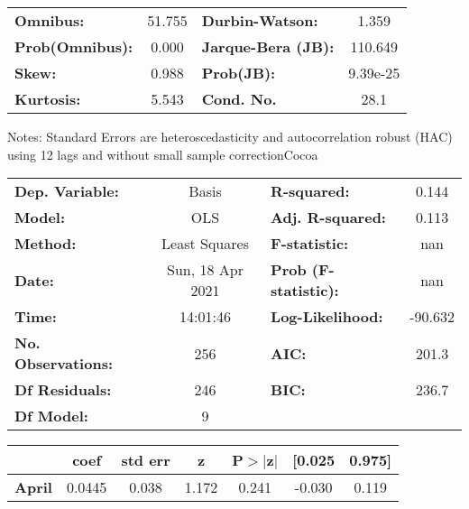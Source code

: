 \begin{center}
\begin{tabular}{lcccccc}
\bottomrule
\end{tabular}
\begin{tabular}{lclc}
\textbf{Omnibus:}       & 51.755 & \textbf{  Durbin-Watson:     } &    1.359  \\
\textbf{Prob(Omnibus):} &  0.000 & \textbf{  Jarque-Bera (JB):  } &  110.649  \\
\textbf{Skew:}          &  0.988 & \textbf{  Prob(JB):          } & 9.39e-25  \\
\textbf{Kurtosis:}      &  5.543 & \textbf{  Cond. No.          } &     28.1  \\
\bottomrule
\end{tabular}
\end{center}

Notes: \newline
 [1] Standard Errors are heteroscedasticity and autocorrelation robust (HAC) using 12 lags and without small sample correctionCocoa\begin{center}
\begin{tabular}{lclc}
\toprule
\textbf{Dep. Variable:}    &      Basis       & \textbf{  R-squared:         } &     0.144   \\
\textbf{Model:}            &       OLS        & \textbf{  Adj. R-squared:    } &     0.113   \\
\textbf{Method:}           &  Least Squares   & \textbf{  F-statistic:       } &       nan   \\
\textbf{Date:}             & Sun, 18 Apr 2021 & \textbf{  Prob (F-statistic):} &      nan    \\
\textbf{Time:}             &     14:01:46     & \textbf{  Log-Likelihood:    } &   -90.632   \\
\textbf{No. Observations:} &         256      & \textbf{  AIC:               } &     201.3   \\
\textbf{Df Residuals:}     &         246      & \textbf{  BIC:               } &     236.7   \\
\textbf{Df Model:}         &           9      & \textbf{                     } &             \\
\bottomrule
\end{tabular}
\begin{tabular}{lcccccc}
                   & \textbf{coef} & \textbf{std err} & \textbf{z} & \textbf{P$> |$z$|$} & \textbf{[0.025} & \textbf{0.975]}  \\
\midrule
\textbf{April}     &       0.0445  &        0.038     &     1.172  &         0.241        &       -0.030    &        0.119     \\

\end{tabular}
\end{center}
